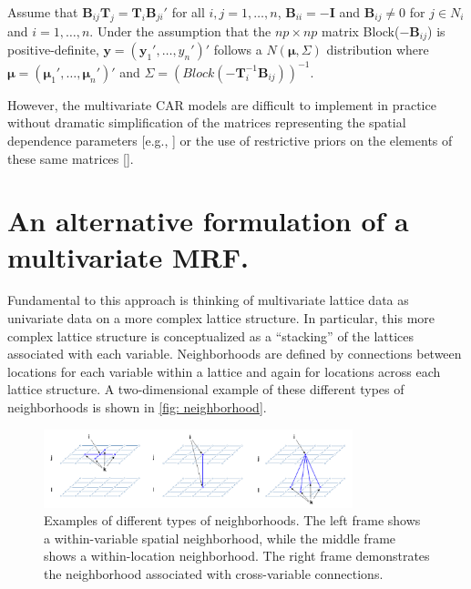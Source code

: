 \documentclass[12pt]{amsart}
\begin{document}
Assume that $\boldsymbol{B}_{ij} \boldsymbol{T}_j = \boldsymbol{T}_i \boldsymbol{B}_{ji}'$ for all $i,j = 1,\dots,n$, $\boldsymbol{B}_{ii} = -\boldsymbol{I}$ and $\boldsymbol{B}_{ij} \neq 0$ for $j \in N_i$ and $i = 1,\dots,n$. Under the assumption that the $np \times np$ matrix Block($-\boldsymbol{B}_{ij}$) is positive-definite, $\boldsymbol{y} = (\boldsymbol{y}_1',\dots,y_n')'$ follows a $N(\boldsymbol{\mu}, \Sigma)$ distribution where $\boldsymbol{\mu} = (\boldsymbol{\mu}_1',\dots,\boldsymbol{\mu}_n')'$ and $ \Sigma = (Block(-\boldsymbol{T}^{-1}_i \boldsymbol{B}_{ij} ))^{-1}$.

However, the multivariate CAR models are difficult to implement in practice without dramatic simplification of the matrices representing the spatial dependence parameters [e.g., \cite{bill}] or the use of restrictive priors on the elements of these same matrices [\cite{sain2}].

\section{An alternative formulation of a multivariate MRF.}

Fundamental to this approach is thinking of multivariate lattice data as univariate data on a more complex lattice structure. In particular, this more complex lattice structure is conceptualized as a “stacking” of the lattices associated with each variable. Neighborhoods are defined by connections between locations for each variable within a lattice and again for locations across each lattice structure. A two-dimensional example of these different types of neighborhoods is shown in \ref{fig: neighborhood}.

\begin{figure}[H]
    \centering
    \includegraphics[width = 0.8\textwidth]{neighborhoods.png}
    \caption{Examples of different types of neighborhoods. The left frame shows a within-variable spatial neighborhood, while the middle frame shows a within-location neighborhood. The right frame demonstrates the neighborhood associated with cross-variable connections.}
    \label{fig: neighborhoods}
\end{figure}
\end{document}
